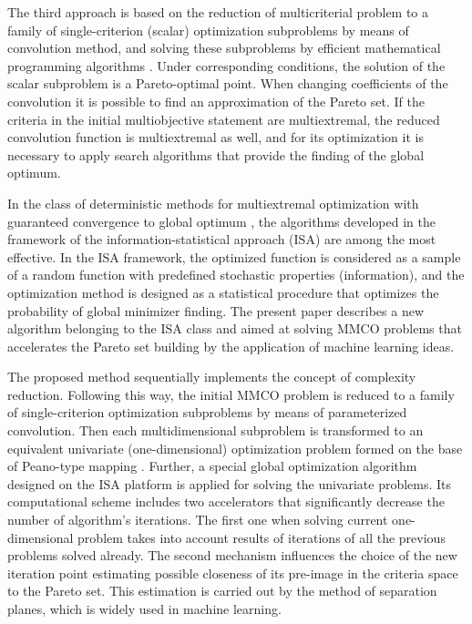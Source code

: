 \documentclass[runningheads]{llncs}
\begin{document}
The third approach is based on the reduction of multicriterial problem to a family of single-criterion (scalar) optimization subproblems by means of convolution method, and solving these subproblems by efficient mathematical programming algorithms \cite{Collette2004,Marler2009,Marler2004,Pardalos2017,Wierzbicki,Ehrgott2005,GergelKozinov2020}. Under corresponding conditions, the solution of the scalar subproblem is a Pareto-optimal point. When changing coefficients of the convolution it is possible to find an approximation of the Pareto set. If the criteria in the initial multiobjective statement are multiextremal, the reduced convolution function is multiextremal as well, and for its optimization it is necessary to apply search algorithms that provide the finding of the global optimum. 


In the class of deterministic methods for multiextremal optimization with guaranteed convergence to global optimum \cite{Gablonsky2001,Sergeyev2010,Sergeyev2006,Evtushenko2014,Strongin2003,Sergeyev2013}, the algorithms developed in the framework of the information-statistical approach (ISA) \cite{Gergel2018,Barkalov2018} are among the most effective. In the ISA framework, the optimized function is considered as a sample of a random function with predefined stochastic properties (information), and the optimization method is designed as a statistical procedure that optimizes the probability of global minimizer finding. The present paper describes a new algorithm belonging to the ISA class and aimed at solving MMCO problems that accelerates the Pareto set building by the application of machine learning ideas.


The proposed method sequentially implements the concept of complexity reduction. Following this way, the initial MMCO problem is reduced to a family of single-criterion optimization subproblems by means of parameterized convolution. Then each multidimensional subproblem is transformed to an equivalent univariate (one-dimensional) optimization problem formed on the base of Peano-type mapping \cite{Evtushenko2014,Gergel2018,Marler2004,Pardalos2017}. Further, a special global optimization algorithm designed on the ISA platform is applied for solving the univariate problems. Its computational scheme includes two accelerators that significantly decrease the number of algorithm's iterations. The first one when solving current one-dimensional problem takes into account results of iterations of all the previous problems solved already. The second mechanism influences the choice of the new iteration point estimating possible closeness of its pre-image in the criteria space to the Pareto set. This estimation is carried out by the method of separation planes, which is widely used in machine learning. 
\end{document}

